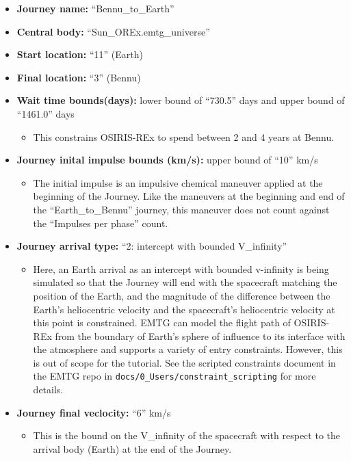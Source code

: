 \documentclass[11pt]{article}
\begin{document}
\begin{itemize}
	\item \textbf{Journey name:} ``Bennu\_to\_Earth''
	\item \textbf{Central body:} ``Sun\_OREx.emtg\_universe''
	\item \textbf{Start location:} ``11'' (Earth)
	\item \textbf{Final location:} ``3'' (Bennu)
	\item \textbf{Wait time bounds(days):} lower bound of ``730.5'' days and upper bound of ``1461.0'' days
	\begin{itemize}
		\item This constrains OSIRIS-REx to spend between 2 and 4 years at Bennu.
	\end{itemize}
	\item \textbf{Journey inital impulse bounds (km/s):} upper bound of ``10'' km/s
	\begin{itemize}
		\item  The initial impulse is an impulsive chemical maneuver applied at the beginning of the Journey. Like the maneuvers at the beginning and end of the ``Earth\_to\_Bennu'' journey, this maneuver does not count against the ``Impulses per phase'' count.
	\end{itemize}
	\item \textbf{Journey arrival type:} ``2: intercept with bounded V\_infinity''
	\begin{itemize}
		\item Here, an Earth arrival as an intercept with bounded v-infinity is being simulated so that the Journey will end with the spacecraft matching the position of the Earth, and the magnitude of the difference between the Earth’s heliocentric velocity and the spacecraft’s heliocentric velocity at this point is constrained. \ac{EMTG} can model the flight path of OSIRIS-REx from the boundary of Earth’s sphere of influence to its interface with the atmosphere and supports a variety of entry constraints. However, this is out of scope for the tutorial. See the scripted constraints document in the \ac{EMTG} repo in \texttt{docs/0\_Users/constraint\_scripting} for more details.
	\end{itemize}
	\item \textbf{Journey final veclocity:} ``6'' km/s
	\begin{itemize}
		\item This is the bound on the V\_infinity of the spacecraft with respect to the arrival body (Earth) at the end of the Journey.
	\end{itemize}
\end{itemize}
\end{document}

